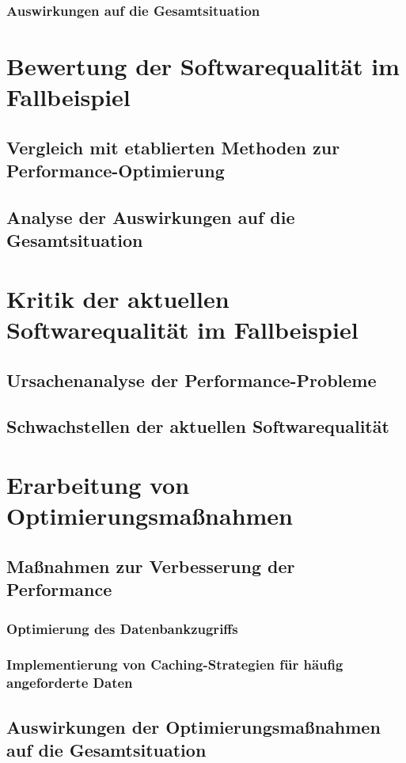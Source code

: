\documentclass{article}
\begin{document}
\subsubsection{Auswirkungen auf die Gesamtsituation}

\section{Bewertung der Softwarequalität im Fallbeispiel}
\subsection{Vergleich mit etablierten Methoden zur Performance-Optimierung}
\subsection{Analyse der Auswirkungen auf die Gesamtsituation}

\section{Kritik der aktuellen Softwarequalität im Fallbeispiel}
\subsection{Ursachenanalyse der Performance-Probleme}
\subsection{Schwachstellen der aktuellen Softwarequalität}

\section{Erarbeitung von Optimierungsmaßnahmen}
\subsection{Maßnahmen zur Verbesserung der Performance}
\subsubsection{Optimierung des Datenbankzugriffs}
\subsubsection{Implementierung von Caching-Strategien für häufig angeforderte Daten}
\subsection{Auswirkungen der Optimierungsmaßnahmen auf die Gesamtsituation}
\end{document}
